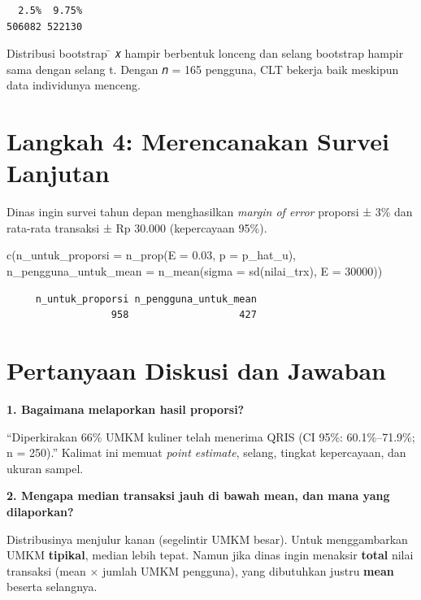 \documentclass[
  indonesian,
  letterpaper,
]{book}
\newenvironment{Shaded}{\begin{snugshade}}{\end{snugshade}}
\newcommand{\AttributeTok}[1]{\textcolor[rgb]{0.40,0.45,0.13}{#1}}
\newcommand{\DecValTok}[1]{\textcolor[rgb]{0.68,0.00,0.00}{#1}}
\newcommand{\FloatTok}[1]{\textcolor[rgb]{0.68,0.00,0.00}{#1}}
\newcommand{\FunctionTok}[1]{\textcolor[rgb]{0.28,0.35,0.67}{#1}}
\newcommand{\NormalTok}[1]{\textcolor[rgb]{0.00,0.23,0.31}{#1}}
\begin{document}
\begin{verbatim}
  2.5%  9.75% 
506082 522130 
\end{verbatim}

Distribusi bootstrap ̄ 𝑥 hampir berbentuk lonceng dan selang bootstrap
hampir sama dengan selang t. Dengan 𝑛 = 165 pengguna, CLT bekerja baik
meskipun data individunya menceng.

\section{Langkah 4: Merencanakan Survei
Lanjutan}\label{langkah-4-merencanakan-survei-lanjutan}

Dinas ingin survei tahun depan menghasilkan \emph{margin of error}
proporsi ± 3\% dan rata-rata transaksi ± Rp 30.000 (kepercayaan 95\%).

\begin{Shaded}
\begin{Highlighting}[]
\FunctionTok{c}\NormalTok{(}\AttributeTok{n\_untuk\_proporsi =} \FunctionTok{n\_prop}\NormalTok{(}\AttributeTok{E =} \FloatTok{0.03}\NormalTok{, }\AttributeTok{p =}\NormalTok{ p\_hat\_u),}
\AttributeTok{n\_pengguna\_untuk\_mean =} \FunctionTok{n\_mean}\NormalTok{(}\AttributeTok{sigma =} \FunctionTok{sd}\NormalTok{(nilai\_trx), }\AttributeTok{E =} \DecValTok{30000}\NormalTok{))}
\end{Highlighting}
\end{Shaded}

\begin{verbatim}
     n_untuk_proporsi n_pengguna_untuk_mean 
                  958                   427 
\end{verbatim}

\section{Pertanyaan Diskusi dan
Jawaban}\label{pertanyaan-diskusi-dan-jawaban}

\textbf{1. Bagaimana melaporkan hasil proporsi?}

``Diperkirakan 66\% UMKM kuliner telah menerima QRIS (CI 95\%:
60.1\%--71.9\%; n = 250).'' Kalimat ini memuat \emph{point estimate},
selang, tingkat kepercayaan, dan ukuran sampel.

\textbf{2. Mengapa median transaksi jauh di bawah mean, dan mana yang
dilaporkan?}

Distribusinya menjulur kanan (segelintir UMKM besar). Untuk
menggambarkan UMKM \textbf{tipikal}, median lebih tepat. Namun jika
dinas ingin menaksir \textbf{total} nilai transaksi (mean \(\times\)
jumlah UMKM pengguna), yang dibutuhkan justru \textbf{mean} beserta
selangnya.
\end{document}
